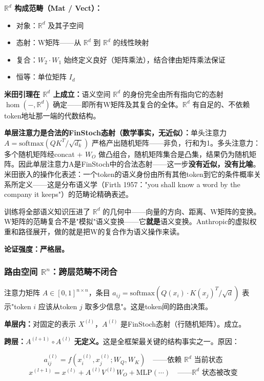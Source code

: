 \documentclass[11pt,a4paper]{article}
\theoremstyle{definition}
\begin{document}
\textbf{$\mathbb{R}^d$ 构成范畴（Mat / Vect）：}
\begin{itemize}[leftmargin=*,itemsep=0.2em]
    \item 对象：$\mathbb{R}^d$ 及其子空间
    \item 态射：W矩阵——从 $\mathbb{R}^d$ 到 $\mathbb{R}^d$ 的线性映射
    \item 复合：$W_2 \cdot W_1$ 始终定义良好（矩阵乘法），结合律由矩阵乘法保证
    \item 恒等：单位矩阵 $I_d$
\end{itemize}

\textbf{米田引理在 $\mathbb{R}^d$ 上成立：}语义空间 $\mathbb{R}^d$ 的身份完全由所有指向它的态射 $\hom(-, \mathbb{R}^d)$ 确定——即所有W矩阵及其复合的全体。$\mathbb{R}^d$ 有自足的、不依赖token地址那一端的代数结构。

\textbf{单层注意力是合法的FinStoch态射（数学事实，无近似）：}单头注意力 $A = \text{softmax}(QK^T / \sqrt{d_k})$ 严格产出随机矩阵——非负，行和为1。多头注意力：多个随机矩阵经concat + $W_O$ 做凸组合，随机矩阵集合是凸集，结果仍为随机矩阵。因此单层注意力A是FinStoch中的合法态射——这一步\textbf{没有近似，没有比喻}。米田嵌入的操作化表述：一个token的语义身份由所有其他token到它的条件概率关系所定义——这是分布语义学（Firth 1957："you shall know a word by the company it keeps"）的范畴论精确表述。

训练将全部语义知识压进了 $\mathbb{R}^d$ 的几何中——向量的方向、距离、W矩阵的变换。W矩阵的范畴复合不是"模拟"语义变换——它\textbf{就是}语义变换。Anthropic的虚拟权重和路径展开，做的就是把W的复合作为语义操作来读。

\textbf{论证强度：严格层。}

\subsubsection{路由空间 $\mathbb{R}^n$：跨层范畴不闭合}
\label{sec:routing_space}

注意力矩阵 $A \in [0,1]^{n \times n}$，条目 $a_{ij} = \text{softmax}(Q(x_i) \cdot K(x_j)^T / \sqrt{d})$ 表示"token $i$ 应该从token $j$ 取多少信息"。这是token间的路由决策。

\textbf{单层内：}对固定的表示 $X^{(l)}$，$A^{(l)}$ 是FinStoch态射（行随机矩阵）。成立。

\textbf{跨层：}$A^{(l+1)} \circ A^{(l)}$ \textbf{无定义。}这是全框架最关键的结构事实之一。原因：

\begin{equation}
a_{ij}^{(l)} = f(x_i^{(l)}, x_j^{(l)}; W_Q, W_K) \quad \text{——依赖 $\mathbb{R}^d$ 当前状态}
\end{equation}
\begin{equation}
x^{(l+1)} = x^{(l)} + A^{(l)}V^{(l)}W_O + \text{MLP}(\cdots) \quad \text{——$\mathbb{R}^d$ 状态被改变}
\end{equation}
\end{document}
